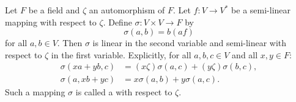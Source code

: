 Let $F$ be a field and $\zeta$ an automorphism of $F$. Let $f \colon V \to V^*$ be a semi-linear mapping with respect to $\zeta$. Define $\sigma \colon V \times V \to F$ by
$$\sigma(a, b) = b(af)$$
for all $a, b \in V$. Then $\sigma$ is linear in the second variable and semi-linear with respect to $\zeta$ in the first variable. Explicitly, for all $a, b, c \in V$ and all $x, y \in F$:
\begin{align*}
\sigma(xa + yb, c) &= (x\zeta)\sigma(a, c) + (y\zeta)\sigma(b, c), \\
\sigma(a, xb + yc) &= x\sigma(a, b) + y\sigma(a, c).
\end{align*}
Such a mapping $\sigma$ is called a  with respect to $\zeta$.
